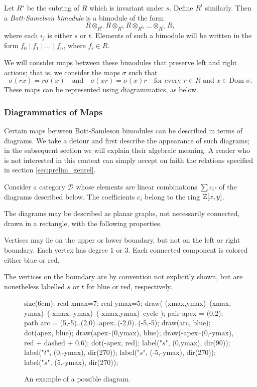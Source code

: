 Let $R^s$ be the subring of $R$ which is invariant under $s$.  Define $R^t$ similarly.  Then a \emph{Bott-Samelson bimodule} is a bimodule of the form
\[ R \otimes_{R^{i_1}} R \otimes_{R^{i_2}} R \otimes_{R^{i_3}} \dots \otimes_{R^{i_n}} R, \]
where each $i_j$ is either $s$ or $t$.   Elements of such a bimodule will be written in the form $f_0 \mid f_1 \mid \dots \mid f_n$, where $f_i \in R$.

We will consider maps between these bimodules that preserve left and right actions; that is, we consider the maps $\sigma$ such that
\begin{equation}
	\sigma(rx) = r\sigma(x) \quad\text{and}\quad \sigma(xr) = \sigma(x)r \quad\text{for every $r \in R$ and $x \in \text{Dom } \sigma$}.
	\label{eq:respect}
\end{equation}
These maps can be represented using diagrammatics, as below.

\subsubsection{Diagrammatics of Maps}
\label{sec:prelim_map}
\newcommand{\DD}{\mathcal D}
Certain maps between Bott-Samleson bimodules can be described in terms of diagrams.  We take a detour and first describe the appearance of such diagrams; in the subsequent section we will explain their algebraic meaning.  A reader who is not interested in this context can simply accept on faith the relations specified in section \ref{sec:prelim_genrel}.

Consider a category $\DD$ whose elements are linear combinations $\sum c_i \square$ of the diagrams described below.  The coefficients $c_i$ belong to the ring $\mathbb Z[x,y]$.

The diagrams may be described as planar graphs, not necessarily connected, drawn in a rectangle, with the following properties.
\begin{enumerate}[(i)]
	\ii Vertices may lie on the upper or lower boundary, but not on the left or right boundary.
	\ii Each vertex has degree $1$ or $3$.
	\ii Each connected component is colored either blue or red.
\end{enumerate}
The vertices on the boundary are by convention not explicitly shown, but are nonetheless labelled $s$ or $t$ for blue or red, respectively.

\begin{figure}[ht]
	\centering
	\begin{asy}
	size(6cm);
	real xmax=7;
	real ymax=5;
	draw( (xmax,ymax)--(xmax,-ymax)--(-xmax,-ymax)--(-xmax,ymax)--cycle );
	pair apex = (0,2);
	path arc = (5,-5)..(2,0)..apex..(-2,0)..(-5,-5);
	draw(arc, blue);
	dot(apex, blue);
	draw(apex--(0,ymax), blue);
	draw(-apex--(0,-ymax), red + dashed + 0.6);
	dot(-apex, red);
	label("$s$", (0,ymax), dir(90));
	label("$t$", (0,-ymax), dir(270));
	label("$s$", (-5,-ymax), dir(270));
	label("$s$", (5,-ymax), dir(270));
	\end{asy}
	\caption{An example of a possible diagram.}
	\label{fig:example_diagram}
\end{figure}

